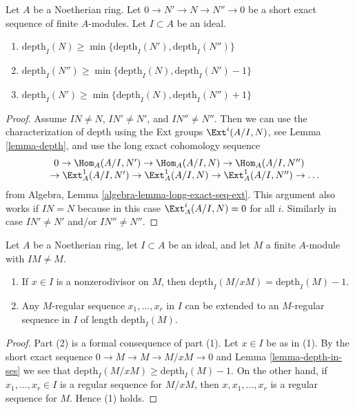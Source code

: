 \begin{lemma}
\label{lemma-depth-in-ses}
Let $A$ be a Noetherian ring. Let $0 \to N' \to N \to N'' \to 0$
be a short exact sequence of finite $A$-modules.
Let $I \subset A$ be an ideal.
\begin{enumerate}
\item
$\text{depth}_I(N) \geq \min\{\text{depth}_I(N'), \text{depth}_I(N'')\}$
\item
$\text{depth}_I(N'') \geq \min\{\text{depth}_I(N), \text{depth}_I(N') - 1\}$
\item
$\text{depth}_I(N') \geq \min\{\text{depth}_I(N), \text{depth}_I(N'') + 1\}$
\end{enumerate}
\end{lemma}

\begin{proof}
Assume $IN \not = N$, $IN' \not = N'$, and $IN'' \not = N''$. Then we
can use the characterization of depth using the Ext groups
$\Ext^i(A/I, N)$, see Lemma \ref{lemma-depth},
and use the long exact cohomology sequence
$$
\begin{matrix}
0
\to \Hom_A(A/I, N')
\to \Hom_A(A/I, N)
\to \Hom_A(A/I, N'')
\\
\phantom{0\ }
\to \Ext^1_A(A/I, N')
\to \Ext^1_A(A/I, N)
\to \Ext^1_A(A/I, N'')
\to \ldots
\end{matrix}
$$
from Algebra, Lemma \ref{algebra-lemma-long-exact-seq-ext}.
This argument also works if $IN = N$
because in this case $\Ext^i_A(A/I, N) = 0$ for all $i$.
Similarly in case $IN' \not = N'$ and/or $IN'' \not = N''$.
\end{proof}

\begin{lemma}
\label{lemma-depth-drops-by-one}
Let $A$ be a Noetherian ring, let $I \subset A$ be an ideal, and
let $M$ a finite $A$-module with $IM \not = M$.
\begin{enumerate}
\item If $x \in I$ is a nonzerodivisor on $M$, then
$\text{depth}_I(M/xM) = \text{depth}_I(M) - 1$.
\item Any $M$-regular sequence $x_1, \ldots, x_r$ in $I$ can be extended to an
$M$-regular sequence in $I$ of length $\text{depth}_I(M)$.
\end{enumerate}
\end{lemma}

\begin{proof}
Part (2) is a formal consequence of part (1). Let $x \in I$ be as in (1).
By the short exact sequence $0 \to M \to M \to M/xM \to 0$ and
Lemma \ref{lemma-depth-in-ses} we see that
$\text{depth}_I(M/xM) \geq \text{depth}_I(M) - 1$.
On the other hand, if $x_1, \ldots, x_r \in I$
is a regular sequence for $M/xM$, then $x, x_1, \ldots, x_r$
is a regular sequence for $M$. Hence (1) holds.
\end{proof}

